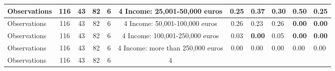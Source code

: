 \begin{tabular}{l c c c c c c }
Observations &       116 &        43 &        82 &         6 &         4
Income: 25,001-50,000 euros &      0.25 &      0.37 &      0.30 &      0.50 &      0.25 \\
\midrule
Observations &       116 &        43 &        82 &         6 &         4
Income: 50,001-100,000 euros &      0.26 &      0.23 &      0.26 & \textbf{     0.00} & \textbf{     0.00} \\
\midrule
Observations &       116 &        43 &        82 &         6 &         4
Income: 100,001-250,000 euros &      0.03 & \textbf{     0.00} &      0.05 & \textbf{     0.00} & \textbf{     0.00} \\
\midrule
Observations &       116 &        43 &        82 &         6 &         4
Income: more than 250,000 euros &      0.00 &      0.00 &      0.00 &      0.00 &      0.00 \\
\midrule
Observations &       116 &        43 &        82 &         6 &         4
\bottomrule
\end{tabular}
